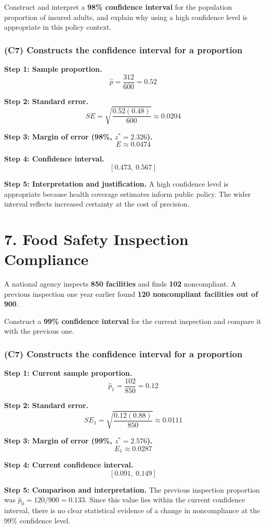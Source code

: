 Construct and interpret a \textbf{98\% confidence interval} for the population proportion of insured adults, and explain why using a high confidence level is appropriate in this policy context.
	
	\subsubsection*{(C7) Constructs the confidence interval for a proportion}
	
	\textbf{Step 1: Sample proportion.}
	\[
	\hat{p} = \frac{312}{600} = 0.52
	\]
	
	\textbf{Step 2: Standard error.}
	\[
	SE = \sqrt{\frac{0.52(0.48)}{600}} \approx 0.0204
	\]
	
	\textbf{Step 3: Margin of error (98\%, \(z^* = 2.326\)).}
	\[
	E \approx 0.0474
	\]
	
	\textbf{Step 4: Confidence interval.}
	\[
	[0.473,\ 0.567]
	\]
	
	\textbf{Step 5: Interpretation and justification.}
	A high confidence level is appropriate because health coverage estimates inform public policy. The wider interval reflects increased certainty at the cost of precision.
	
	\section*{7. Food Safety Inspection Compliance}
	
	A national agency inspects \textbf{850 facilities} and finds \textbf{102} noncompliant. A previous inspection one year earlier found \textbf{120 noncompliant facilities out of 900}.
	
	Construct a \textbf{99\% confidence interval} for the current inspection and compare it with the previous one.
	
	\subsubsection*{(C7) Constructs the confidence interval for a proportion}
	
	\textbf{Step 1: Current sample proportion.}
	\[
	\hat{p}_1 = \frac{102}{850} = 0.12
	\]
	
	\textbf{Step 2: Standard error.}
	\[
	SE_1 = \sqrt{\frac{0.12(0.88)}{850}} \approx 0.0111
	\]
	
	\textbf{Step 3: Margin of error (99\%, \(z^* = 2.576\)).}
	\[
	E_1 \approx 0.0287
	\]
	
	\textbf{Step 4: Current confidence interval.}
	\[
	[0.091,\ 0.149]
	\]
	
	\textbf{Step 5: Comparison and interpretation.}
	The previous inspection proportion was \(\hat{p}_0 = 120/900 = 0.133\). Since this value lies within the current confidence interval, there is no clear statistical evidence of a change in noncompliance at the 99\% confidence level.
	

